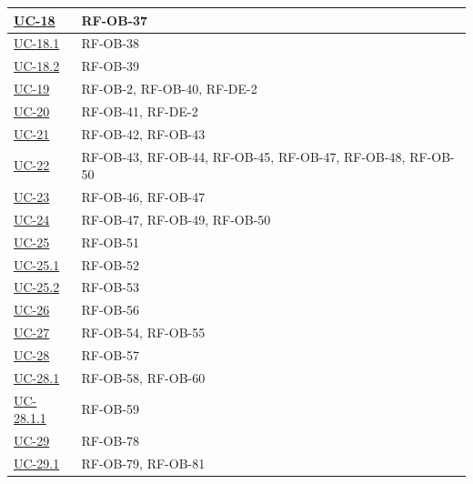 \documentclass[a4paper,12pt]{article}
\begin{document}
\begin{center}
\begin{longtable}{|>{\centering\arraybackslash}p{5cm}|>{\centering\arraybackslash}p{9cm}|}
\hyperref[sec:UC-18]{UC-18} & RF-OB-37 \\
\hline

\hyperref[subsec:UC-18.1]{UC-18.1} & RF-OB-38 \\
\hline

\hyperref[subsec:UC-18.2]{UC-18.2} & RF-OB-39 \\
\hline

\hyperref[sec:UC-19]{UC-19} & RF-OB-2, RF-OB-40, RF-DE-2 \\
\hline

\hyperref[sec:UC-20]{UC-20} & RF-OB-41, RF-DE-2 \\
\hline

\hyperref[subsec:UC-21]{UC-21} & RF-OB-42, RF-OB-43 \\
\hline

\hyperref[subsec:UC-22]{UC-22} & RF-OB-43, RF-OB-44, RF-OB-45, RF-OB-47, RF-OB-48, RF-OB-50 \\
\hline

\hyperref[subsec:UC-23]{UC-23} & RF-OB-46, RF-OB-47 \\
\hline

\hyperref[subsec:UC-24]{UC-24} & RF-OB-47, RF-OB-49, RF-OB-50 \\
\hline

\hyperref[subsec:UC-25]{UC-25} & RF-OB-51 \\
\hline

\hyperref[subsec:UC-25.1]{UC-25.1} & RF-OB-52 \\
\hline

\hyperref[subsec:UC-25.2]{UC-25.2} & RF-OB-53 \\
\hline

\hyperref[subsec:UC-26]{UC-26} & RF-OB-56 \\
\hline

\hyperref[subsec:UC-27]{UC-27} & RF-OB-54, RF-OB-55 \\
\hline

\hyperref[subsec:UC-28]{UC-28} & RF-OB-57 \\
\hline

\hyperref[subsec:UC-28.1]{UC-28.1} & RF-OB-58, RF-OB-60 \\
\hline

\hyperref[subsec:UC-28.1.1]{UC-28.1.1} & RF-OB-59 \\
\hline

\hyperref[subsec:UC-29]{UC-29} & RF-OB-78 \\
\hline

\hyperref[subsec:UC-29.1]{UC-29.1} & RF-OB-79, RF-OB-81 \\
\hline


\end{longtable}
\end{center}
\end{document}
